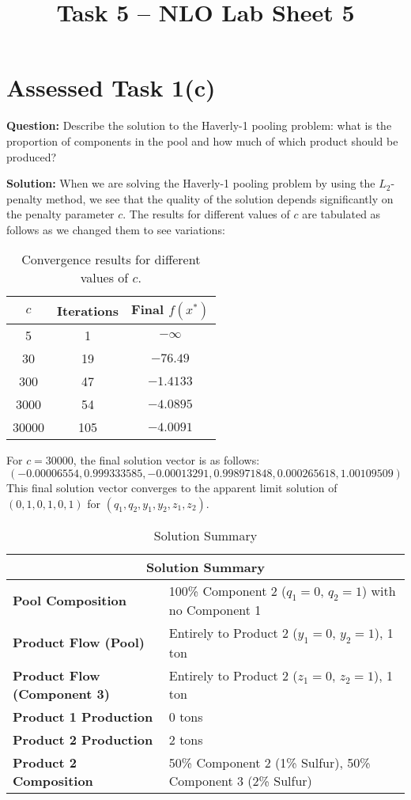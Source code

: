 \documentclass{article}
\title{Task 5 -- NLO Lab Sheet 5}
\begin{document}
\section{Assessed Task 1(c)}
\textbf{Question:} Describe the solution to the Haverly-1 pooling problem: what is the proportion of components in the pool and how much of which product should be produced?

\textbf{Solution:}
When we are solving the Haverly-1 pooling problem by using the $L_2$-penalty method, we see that the quality of the solution depends significantly on the penalty parameter $c$. The results for different values of $c$ are tabulated as follows as we changed them to see variations:

\begin{table}[h]
    \centering
    \begin{tabular}{c c c}
        \toprule
        $c$ & Iterations & Final $f(x^*)$ \\
        \midrule
        5 & 1 & $-\infty$ \\
        30 & 19 & $-76.49$ \\
        300 & 47 & $-1.4133$ \\
        3000 & 54 & $-4.0895$ \\
        30000 & 105 & $-4.0091$ \\
        \bottomrule
    \end{tabular}
    \caption{Convergence results for different values of $c$.}
    \label{tab:convergence}
\end{table}


For $c = 30000$, the final solution vector is as follows:
\[
(-0.00006554, 0.999333585, -0.00013291, 0.998971848, 0.000265618, 1.00109509)
\]
This final solution vector converges to the apparent limit solution of $(0, 1, 0, 1, 0, 1)$ for $(q_1, q_2, y_1, y_2, z_1, z_2)$.

\newpage
\renewcommand{\arraystretch}{1.3} %
\begin{table}[]
    \centering
    \small %
    \begin{tabular}{ p{4cm} p{10cm} }
        \toprule
        \multicolumn{2}{c}{\textbf{Solution Summary}} \\
        \midrule
        \textbf{Pool Composition} & 100\% Component 2 ($q_1=0$, $q_2=1$) with no Component 1 \\
        \textbf{Product Flow (Pool)} & Entirely to Product 2 ($y_1=0$, $y_2=1$), 1 ton \\
        \textbf{Product Flow (Component 3)} & Entirely to Product 2 ($z_1=0$, $z_2=1$), 1 ton \\
        \textbf{Product 1 Production} & 0 tons \\
        \textbf{Product 2 Production} & 2 tons \\
        \textbf{Product 2 Composition} & 50\% Component 2 (1\% Sulfur), 50\% Component 3 (2\% Sulfur) \\
        \bottomrule
    \end{tabular}
    \caption{Solution Summary}
    \label{Table 2}
\end{table}
\end{document}
